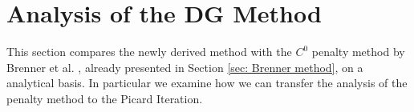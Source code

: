 
\section{Analysis of the DG Method} \label{sec: DG analysis}
This section compares the newly derived method with the $C^0$ penalty method by Brenner et al. \cite{BGN+2011}, already presented in Section \ref{sec: Brenner method}, on a analytical basis. In particular we examine how we can transfer the analysis of the penalty method to the Picard Iteration.

